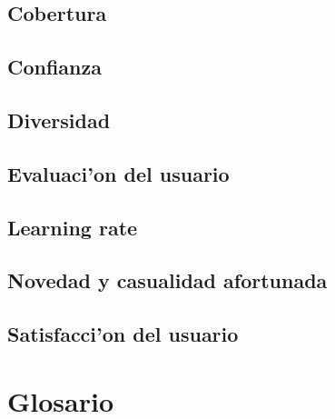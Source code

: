 \documentclass[11pt]{article}
\begin{document}
\subsection{Cobertura}

\subsection{Confianza}

\subsection{Diversidad}

\subsection{Evaluaci'on del usuario}

\subsection{Learning rate}

\subsection{Novedad y casualidad afortunada}

\subsection{Satisfacci'on del usuario}


\newpage
\appendix
\section{Glosario}
\end{document}
